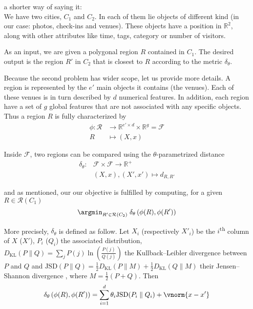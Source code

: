 \begin{comments}
a shorter way of saying it:\\
We have two cities, $C_1$ and $C_2$. In each of them lie objects of different
kind (in our case: photos, check-ins and venues). These objects have a
position in $\mathbb{R}^2$, along with other attributes like time, tags,
category or number of visitors.

As an input, we are given a polygonal region $R$ contained in $C_1$. The
desired output is the region $R'$ in $C_2$ that is closest to $R$ according
to the metric $\delta_{\theta}$.

\end{comments}

Because the second problem has wider scope, let us provide more details.
A region is represented by the $e'$ main objects it contains (the venues).
Each of these venues is in turn described by $d$ numerical features. In
addition, each region have a set of $g$ global features that are not
associated with any specific objects. Thus a region $R$ is fully characterized
by
\begin{align*}
	\phi \colon \mathcal{R} &\to
	\mathbb{R}^{e'\times d} \times \mathbb{R}^g = \mathcal{F} \\
	R &\mapsto (X, x)
\end{align*}

Inside $\mathcal{F}$, two regions can be compared using the
$\theta$-parametrized distance
\begin{align*}
	\delta_{\theta} \colon &\mathcal{F} \times \mathcal{F} \to
	\mathbb{R}^+ \\
	&(X, x) , (X', x') \mapsto d_{R,R'}
\end{align*}

and as mentioned, our our objective is fulfilled by computing, for a given $R
\in \mathcal{R}(C_1)$
\begin{equation}
	\argmin_{R' \in \mathcal{R}(C_2)}\; \delta_{\theta}
	\left(\phi(R), \phi(R')\right)
	\label{e:onetheta}
\end{equation}

More precisely, $\delta_{\theta}$ is defined as follow. Let $X_i$ (respectively $X'_i$) be the $i$\textsuperscript{th} column
of $X$ ($X'$), $P_i$ ($Q_i$) the associated distribution, $D_{\mathrm{KL}}(P
\parallel Q) = \sum_j P(j)\ln\left(\frac{P(j)}{Q(j)}\right)$ the
Kullback--Leibler divergence between $P$ and $Q$ and $ \mathrm{JSD}(P
\parallel Q)= \frac{1}{2}D_{\mathrm{KL}}(P \parallel
M)+\frac{1}{2}D_{\mathrm{KL}}(Q \parallel M)$ their Jensen--Shannon divergence
\autocite{JensenShannon03}, where $M=\frac{1}{2}(P+Q)$. Then
\[
	\delta_{\theta} \left(\phi(R), \phi(R')\right) = \sum_{i=1}^d
	\theta_i \mathrm{JSD}(P_i \parallel Q_i) + \vnorm{x - x'}
\]

